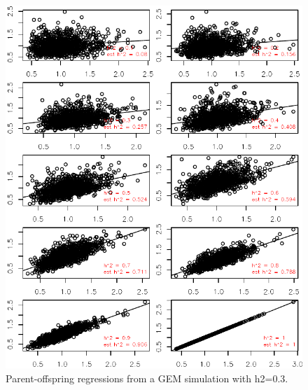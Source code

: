 \documentclass[12pt,reqno,final,pdftex]{amsart}\usepackage[]{graphicx}\usepackage[]{color}
\newenvironment{knitrout}{}{} %
\theoremstyle{plain}
\numberwithin{equation}{part}
\begin{document}
\begin{knitrout}\scriptsize
{}\color{fgcolor}\begin{figure}

\includegraphics[width=\linewidth]{figure/unnamed-chunk-8-1} \hfill{}

\caption[Parent-offspring regressions from a GEM simulation with h2=0.3]{Parent-offspring regressions from a GEM simulation with h2=0.3.}\label{fig:unnamed-chunk-8}
\end{figure}


\end{knitrout}
\end{document}
